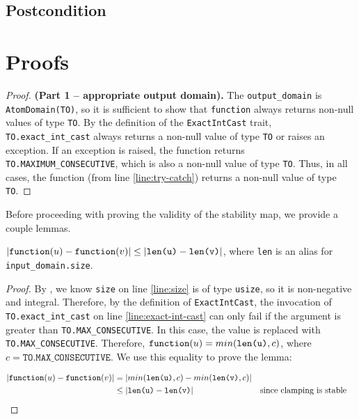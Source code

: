 \documentclass{article}
\begin{document}
\subsection*{Postcondition}

\section{Proofs}

\begin{proof} \textbf{(Part 1 -- appropriate output domain).}
    The \texttt{output\_domain} is \texttt{AtomDomain(TO)}, so it is sufficient to show that \texttt{function} always returns non-null values of type \texttt{TO}.
    By the definition of the \texttt{ExactIntCast} trait, \texttt{TO.exact\_int\_cast} always returns a non-null value of type \texttt{TO} or raises an exception.
    If an exception is raised, the function returns \texttt{TO.MAXIMUM\_CONSECUTIVE}, which is also a non-null value of type \texttt{TO}.
    Thus, in all cases, the function (from line \ref{line:try-catch}) returns a non-null value of type \texttt{TO}.
\end{proof}

Before proceeding with proving the validity of the stability map, we provide a couple lemmas.

\begin{lemma}
    \label{dsym-sens}
    $|\texttt{function}(u) - \texttt{function}(v)| \leq |\texttt{len(u)} - \texttt{len(v)}|$, 
    where \texttt{len} is an alias for \\ \texttt{input\_domain.size}.
\end{lemma}

\begin{proof}
    By , we know \texttt{size} on line \ref{line:size} is of type \texttt{usize}, 
    so it is non-negative and integral.
    Therefore, by the definition of \texttt{ExactIntCast}, 
    the invocation of \texttt{TO.exact\_int\_cast} on line \ref{line:exact-int-cast} can only fail if the argument is greater than \texttt{TO.MAX\_CONSECUTIVE}.
    In this case, the value is replaced with \texttt{TO.MAX\_CONSECUTIVE}.
    Therefore, $\texttt{function}(u) = min(\texttt{len(u)}, c)$, where $c = \texttt{TO.MAX\_CONSECUTIVE}$.
    We use this equality to prove the lemma:

    \begin{align*}
        |\texttt{function}(u) - \texttt{function}(v)| &= |min(\texttt{len(u)}, c) - min(\texttt{len(v)}, c)| \\
        &\leq |\texttt{len(u)} - \texttt{len(v)}| &&\text{since clamping is stable} \\
    \end{align*}
\end{proof}
\end{document}
